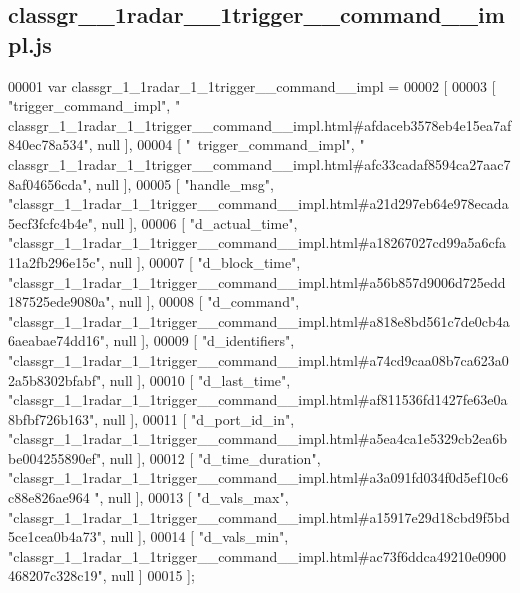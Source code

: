\subsection{classgr\+\_\+\_\+1radar\+\_\+\_\+1trigger\+\_\+\+\_\+command\+\_\+\+\_\+impl.\+js}
\label{classgr__1__1radar__1__1trigger____command____impl_8js_source}

\begin{DoxyCode}
00001 var classgr_1_1radar_1_1trigger__command__impl =
00002 [
00003     [ \textcolor{stringliteral}{"trigger\_command\_impl"}, \textcolor{stringliteral}{"
      classgr\_1\_1radar\_1\_1trigger\_\_command\_\_impl.html#afdaceb3578eb4e15ea7af840ec78a534"}, null ],
00004     [ \textcolor{stringliteral}{"~trigger\_command\_impl"}, \textcolor{stringliteral}{"
      classgr\_1\_1radar\_1\_1trigger\_\_command\_\_impl.html#afc33cadaf8594ca27aac78af04656cda"}, null ],
00005     [ \textcolor{stringliteral}{"handle\_msg"}, \textcolor{stringliteral}{"classgr\_1\_1radar\_1\_1trigger\_\_command\_\_impl.html#a21d297eb64e978ecada5ecf3fcfc4b4e"}, 
      null ],
00006     [ \textcolor{stringliteral}{"d\_actual\_time"}, \textcolor{stringliteral}{"classgr\_1\_1radar\_1\_1trigger\_\_command\_\_impl.html#a18267027cd99a5a6cfa11a2fb296e15c"},
       null ],
00007     [ \textcolor{stringliteral}{"d\_block\_time"}, \textcolor{stringliteral}{"classgr\_1\_1radar\_1\_1trigger\_\_command\_\_impl.html#a56b857d9006d725edd187525ede9080a"}, 
      null ],
00008     [ \textcolor{stringliteral}{"d\_command"}, \textcolor{stringliteral}{"classgr\_1\_1radar\_1\_1trigger\_\_command\_\_impl.html#a818e8bd561c7de0cb4a6aeabae74dd16"}, 
      null ],
00009     [ \textcolor{stringliteral}{"d\_identifiers"}, \textcolor{stringliteral}{"classgr\_1\_1radar\_1\_1trigger\_\_command\_\_impl.html#a74cd9caa08b7ca623a02a5b8302bfabf"},
       null ],
00010     [ \textcolor{stringliteral}{"d\_last\_time"}, \textcolor{stringliteral}{"classgr\_1\_1radar\_1\_1trigger\_\_command\_\_impl.html#af811536fd1427fe63e0a8bfbf726b163"}, 
      null ],
00011     [ \textcolor{stringliteral}{"d\_port\_id\_in"}, \textcolor{stringliteral}{"classgr\_1\_1radar\_1\_1trigger\_\_command\_\_impl.html#a5ea4ca1e5329cb2ea6bbe004255890ef"}, 
      null ],
00012     [ \textcolor{stringliteral}{"d\_time\_duration"}, \textcolor{stringliteral}{"classgr\_1\_1radar\_1\_1trigger\_\_command\_\_impl.html#a3a091fd034f0d5ef10c6c88e826ae964
      "}, null ],
00013     [ \textcolor{stringliteral}{"d\_vals\_max"}, \textcolor{stringliteral}{"classgr\_1\_1radar\_1\_1trigger\_\_command\_\_impl.html#a15917e29d18cbd9f5bd5ce1cea0b4a73"}, 
      null ],
00014     [ \textcolor{stringliteral}{"d\_vals\_min"}, \textcolor{stringliteral}{"classgr\_1\_1radar\_1\_1trigger\_\_command\_\_impl.html#ac73f6ddca49210e0900468207c328c19"}, 
      null ]
00015 ];
\end{DoxyCode}
